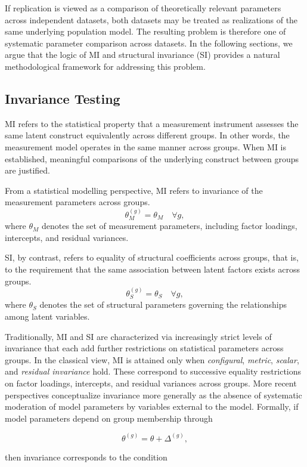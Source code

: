 \documentclass[
  12pt,
  letterpaper,
  man]{apa7}
\begin{document}
If replication is viewed as a comparison of theoretically relevant
parameters across independent datasets, both datasets may be treated as
realizations of the same underlying population model. The resulting
problem is therefore one of systematic parameter comparison across
datasets. In the following sections, we argue that the logic of MI and
structural invariance (SI) provides a natural methodological framework
for addressing this problem.

\subsection{Invariance Testing}\label{invariance-testing}

MI refers to the statistical property that a measurement instrument
assesses the same latent construct equivalently across different groups.
In other words, the measurement model operates in the same manner across
groups. When MI is established, meaningful comparisons of the underlying
construct between groups are justified.

From a statistical modelling perspective, MI refers to invariance of the
measurement parameters across groups.
\[ \theta_M^{(g)} = \theta_M \quad \forall g ,\] where \(\theta_M\)
denotes the set of measurement parameters, including factor loadings,
intercepts, and residual variances.

SI, by contrast, refers to equality of structural coefficients across
groups, that is, to the requirement that the same association between
latent factors exists across groups.
\[\theta_S^{(g)} = \theta_S \quad \forall g,\] where \(\theta_S\)
denotes the set of structural parameters governing the relationships
among latent variables.

Traditionally, MI and SI are characterized via increasingly strict
levels of invariance that each add further restrictions on statistical
parameters across groups. In the classical view, MI is attained only
when \emph{configural}, \emph{metric}, \emph{scalar}, and \emph{residual
invariance} hold. These correspond to successive equality restrictions
on factor loadings, intercepts, and residual variances across groups.
More recent perspectives conceptualize invariance more generally as the
absence of systematic moderation of model parameters by variables
external to the model. Formally, if model parameters depend on group
membership through

\[ \theta^{(g)} = \theta + \Delta^{(g)}, \]

then invariance corresponds to the condition
\end{document}

